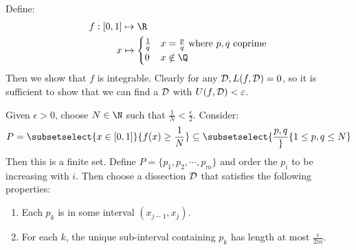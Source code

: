 \documentclass[../Main.tex]{subfiles}
\begin{document}
\begin{example}
    Define:
    \begin{align*}
        f : [0, 1] &\mapsto \R \\
        x &\mapsto
        \begin{cases}
            \frac{1}{q} & x = \frac{p}{q} \text{ where } p, q \text{ coprime} \\
            0 & x \notin \Q
        \end{cases}
    \end{align*}
    Then we show that $f$ is integrable. Clearly for any $\mathcal{D}, L(f, \mathcal{D}) = 0$, so it is sufficient to show that we can find a $\mathcal{D}$ with $U(f, \mathcal{D}) < \varepsilon$.

    Given $\epsilon > 0$, choose $N \in \N$ such that $\frac{1}{N} < \frac{\epsilon}{2}$. Consider:
    \begin{equation*}
        P = \subsetselect{x \in [0, 1]}{f(x) \geq \frac{1}{N}} \subseteq \subsetselect{\frac{p, q}}{1 \leq p, q \leq N}
    \end{equation*}
    Then this is a finite set. Define $P = \{p_1, p_2, \cdots, p_m\}$ and order the $p_i$ to be increasing with $i$. Then choose a dissection $\mathcal{D}$ that satisfies the following properties:
    \begin{enumerate}
        \item Each $p_k$ is in some interval $(x_{j - 1}, x_j)$.
        \item For each $k$, the unique sub-interval containing $p_k$ has length at most $\frac{\epsilon}{2m}$.
    \end{enumerate}
\end{example}
\end{document}
